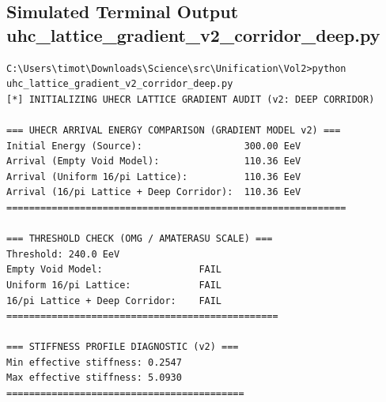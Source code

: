 \documentclass[11pt, letterpaper, openany]{book}
\begin{document}
\subsection*{Simulated Terminal Output uhc_lattice_gradient_v2_corridor_deep.py}
\begin{lstlisting}[style=terminal]
C:\Users\timot\Downloads\Science\src\Unification\Vol2>python uhc_lattice_gradient_v2_corridor_deep.py
[*] INITIALIZING UHECR LATTICE GRADIENT AUDIT (v2: DEEP CORRIDOR)

=== UHECR ARRIVAL ENERGY COMPARISON (GRADIENT MODEL v2) ===
Initial Energy (Source):                  300.00 EeV
Arrival (Empty Void Model):               110.36 EeV
Arrival (Uniform 16/pi Lattice):          110.36 EeV
Arrival (16/pi Lattice + Deep Corridor):  110.36 EeV
============================================================

=== THRESHOLD CHECK (OMG / AMATERASU SCALE) ===
Threshold: 240.0 EeV
Empty Void Model:                 FAIL
Uniform 16/pi Lattice:            FAIL
16/pi Lattice + Deep Corridor:    FAIL
================================================

=== STIFFNESS PROFILE DIAGNOSTIC (v2) ===
Min effective stiffness: 0.2547
Max effective stiffness: 5.0930
==========================================

\end{lstlisting}
\end{document}

